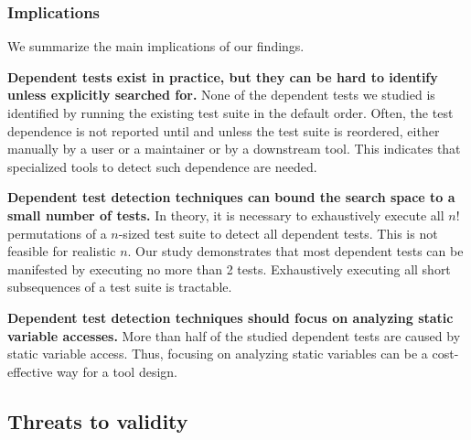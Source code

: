 

\subsubsection{Implications}

We summarize the main implications of our findings.

\noindent \textbf{{Dependent tests exist in practice, but
they can be hard to identify unless explicitly searched for.}}
None of the dependent tests we studied is identified by
running the existing test suite in the default order. Often,
the test dependence is not reported until and unless the
test suite is reordered, either manually by a user or
a maintainer or by a downstream tool. This indicates that
specialized tools to detect such dependence are needed.

\vspace{1mm}
\noindent \textbf{Dependent test detection techniques
can bound the search space to a small number of tests.}
In theory, it is necessary
to exhaustively execute all $n!$ permutations of a $n$-sized
test suite to detect all dependent tests. This is
not feasible for realistic $n$.  Our study demonstrates that
most dependent tests can be manifested by executing
no more than 2 tests.  Exhaustively executing all 
short subsequences of a test suite is tractable.

\vspace{1mm}
\noindent \textbf{Dependent test detection techniques
should focus on analyzing static variable accesses.}
More than half of the studied dependent tests are caused
by static variable access. Thus, focusing on analyzing
static variables can be a cost-effective way for a
tool design. 





\subsection{Threats to validity}

